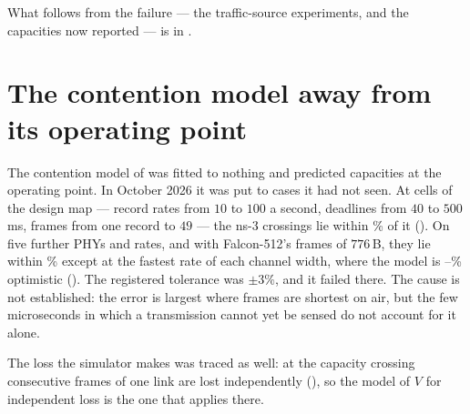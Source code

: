 What follows from the failure --- the traffic-source experiments, and the capacities now
reported --- is in .

\section{The contention model away from its operating point}

The contention model of  was fitted to nothing and predicted capacities at the
operating point. In October 2026 it was put to cases it had not seen. At \dmCells{} cells of the
design map --- record rates from $10$ to $100$ a second, deadlines from $40$ to $500$\,ms, frames
from one record to $49$ --- the ns-3 crossings lie within \dmWorst\% of it (). On
five further PHYs and rates, and with Falcon-512's frames of $776$\,B, they lie within
\phyModelRest\% except at the fastest rate of each channel width, where the model is
\phyModelTopLo--\phyModelTopHi\% optimistic (). The registered tolerance was
$\pm 3\%$, and it failed there. The cause is not established: the error is largest where frames
are shortest on air, but the few microseconds in which a transmission cannot yet be sensed do
not account for it alone.

The loss the simulator makes was traced as well: at the capacity crossing consecutive frames of
one link are lost independently (), so the model of $V$ for independent loss is the
one that applies there.
